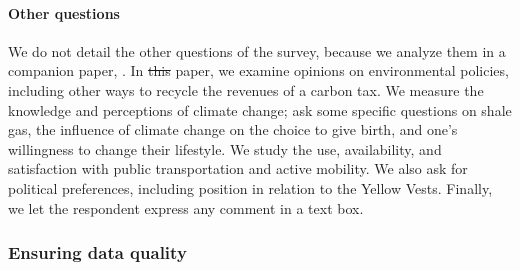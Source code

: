 \documentclass[12pt]{article} %
\providecommand{\DIFaddtex}[1]{{\protect\color{blue}\uwave{#1}}} %
\providecommand{\DIFdeltex}[1]{{\protect\color{red}\sout{#1}}}                      %
\providecommand{\DIFaddbegin}{} %
\providecommand{\DIFaddend}{} %
\providecommand{\DIFdelbegin}{} %
\providecommand{\DIFdelend}{} %
\providecommand{\DIFadd}[1]{\texorpdfstring{\DIFaddtex{#1}}{#1}} %
\providecommand{\DIFdel}[1]{\texorpdfstring{\DIFdeltex{#1}}{}} %
\newcommand{\DIFscaledelfig}{0.5}
\newlength{\DIFdelgraphicswidth} %
\newlength{\DIFdelgraphicsheight} %
\newcommand{\DIFaddincludegraphics}[2][]{{\color{blue}\fbox{\DIFOincludegraphics[#1]{#2}}}} %
\newcommand{\DIFdelincludegraphics}[2][]{%
\sbox{\DIFdelgraphicsbox}{\DIFOincludegraphics[#1]{#2}}%
\settoboxwidth{\DIFdelgraphicswidth}{\DIFdelgraphicsbox} %
\settoboxtotalheight{\DIFdelgraphicsheight}{\DIFdelgraphicsbox} %
\scalebox{\DIFscaledelfig}{%
\parbox[b]{\DIFdelgraphicswidth}{\usebox{\DIFdelgraphicsbox}\\[-\baselineskip] \rule{\DIFdelgraphicswidth}{0em}}\llap{\resizebox{\DIFdelgraphicswidth}{\DIFdelgraphicsheight}{%
\setlength{\unitlength}{\DIFdelgraphicswidth}%
\begin{picture}(1,1)%
\thicklines\linethickness{2pt} %
{\color[rgb]{1,0,0}\put(0,0){\framebox(1,1){}}}%
{\color[rgb]{1,0,0}\put(0,0){\line( 1,1){1}}}%
{\color[rgb]{1,0,0}\put(0,1){\line(1,-1){1}}}%
\end{picture}%
}\hspace*{3pt}}} %
} %
\DeclareRobustCommand{\DIFaddbegin}{\DIFOaddbegin \let\includegraphics\DIFaddincludegraphics} %
\DeclareRobustCommand{\DIFaddend}{\DIFOaddend \let\includegraphics\DIFOincludegraphics} %
\DeclareRobustCommand{\DIFdelbegin}{\DIFOdelbegin \let\includegraphics\DIFdelincludegraphics} %
\DeclareRobustCommand{\DIFdelend}{\DIFOaddend \let\includegraphics\DIFOincludegraphics} %
\begin{document}
\paragraph{Other questions}
We do not detail the other questions of the survey, because we analyze them in a companion paper, \citet{douenne_french_2019}. In \DIFdelbegin \DIFdel{this }\DIFdelend \DIFaddbegin \DIFadd{that }\DIFaddend paper, we examine opinions on environmental policies, including other ways to recycle the revenues of a carbon tax. We measure the knowledge and perceptions of climate change; ask some specific questions on shale gas, the influence of climate change on the choice to give birth, and one's willingness to change their lifestyle. We study the use, availability, and satisfaction with public transportation and active mobility. We also ask for political preferences, including position in relation to the Yellow Vests. Finally, we let the respondent express any comment in a text box.

\subsubsection{Ensuring data quality}
\end{document}
